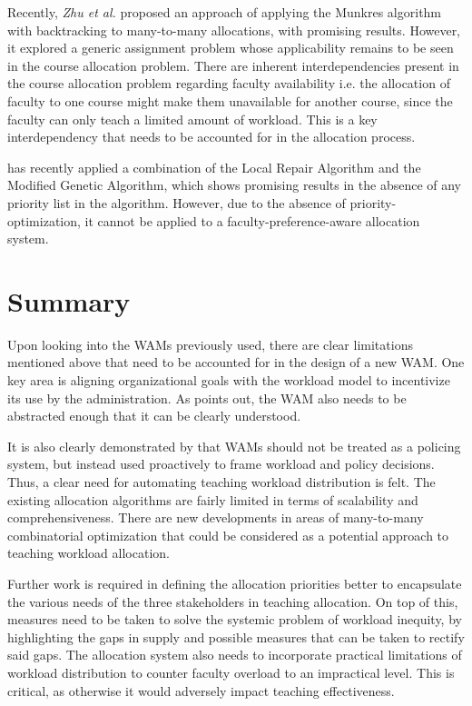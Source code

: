 Recently, \textit{Zhu et al.} \cite{zhu2016solving} proposed an approach of applying the Munkres algorithm with backtracking to many-to-many allocations, with promising results. However, it explored a generic assignment problem whose applicability remains to be seen in the course allocation problem. There are inherent interdependencies present in the course allocation problem regarding faculty availability i.e. the allocation of faculty to one course might make them unavailable for another course, since the faculty can only teach a limited amount of workload. This is a key interdependency that needs to be accounted for in the allocation process.

\cite{dofadar2021hybrid} has recently applied a combination of the Local Repair Algorithm and the Modified Genetic Algorithm, which shows promising results in the absence of any priority list in the algorithm. However, due to the absence of priority-optimization, it cannot be applied to a faculty-preference-aware allocation system.

\section{Summary}

Upon looking into the WAMs previously used, there are clear limitations mentioned above that need to be accounted for in the design of a new WAM. One key area is aligning organizational goals with the workload model to incentivize its use by the administration. As \cite{vardi2009impacts} points out, the WAM also needs to be abstracted enough that it can be clearly understood.

It is also clearly demonstrated by \cite{kenny2014effectiveness} that WAMs should not be treated as a policing system, but instead used proactively to frame workload and policy decisions. Thus, a clear need for automating teaching workload distribution is felt. The existing allocation algorithms are fairly limited in terms of scalability and comprehensiveness. There are new developments in areas of many-to-many combinatorial optimization that could be considered as a potential approach to teaching workload allocation.

Further work is required in defining the allocation priorities better to encapsulate the various needs of the three stakeholders in teaching allocation. On top of this, measures need to be taken to solve the systemic problem of workload inequity, by highlighting the gaps in supply and possible measures that can be taken to rectify said gaps. The allocation system also needs to incorporate practical limitations of workload distribution to counter faculty overload to an impractical level. This is critical, as otherwise it would adversely impact teaching effectiveness.

